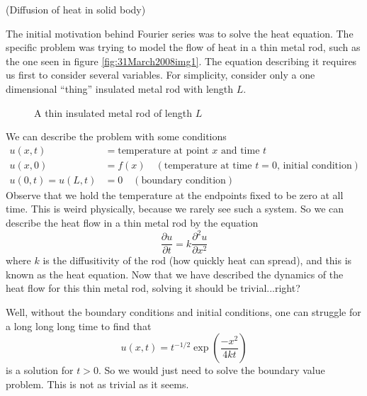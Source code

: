 
\begin{ex}{(Diffusion of heat in solid body)}

The initial motivation behind Fourier series was to solve the
heat equation. The specific problem was trying to model the flow
of heat in a thin metal rod, such as the one seen in figure
\eqref{fig:31March2008img1}. The equation describing it requires
us first to consider several variables. For simplicity, consider
only a one dimensional ``thing'' insulated metal rod with length
$L$. 

\begin{figure}[h!]
  \begin{center}
    
  \end{center}
\caption{A thin insulated metal rod of length $L$}
\label{fig:31March2008img1}
\end{figure}

We can describe the problem with some conditions
\begin{subequations}
\begin{align}
u(x,t) &= \text{temperature at point $x$ and time $t$} \\
u(x,0) &= f(x)\quad (\text{temperature at time $t=0$, initial
  condition}) \\
u(0,t) = u(L,t) &= 0 \quad(\text{boundary condition})
\end{align}
\end{subequations}
Observe that we hold the temperature at the endpoints fixed to be
zero at all time. This is weird physically, because we rarely see
such a system. So we can describe the heat flow in a thin metal
rod by the equation
\begin{equation}\label{eq:31March2008:HeatEqn}
\frac{\partial u}{\partial t} = k\frac{\partial^{2}u}{\partial
  x^{2}}
\end{equation}
where $k$ is the diffusitivity of the rod (how quickly heat can
spread), and this is known as the heat equation. Now that we have
described the dynamics of the heat flow for this thin metal rod,
solving it should be trivial...right? 

Well, without
the boundary conditions and initial conditions, one can struggle
for a long long long time to find that
\begin{equation}\label{eq:31March2008:solution}
u(x,t) = t^{-1/2}\exp\left(\frac{-x^{2}}{4kt}\right)
\end{equation}
is a solution for $t>0$. So we would just need to solve the
boundary value problem. This is not as trivial as it seems.
\end{ex}

